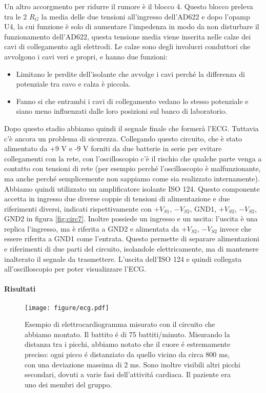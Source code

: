 Un altro accorgmento per ridurre il rumore è il blocco 4. Questo blocco preleva tra le 2 $R_G$ la media
delle due tensioni all'ingresso dell'AD622 e dopo l'opamp U4, la cui funzione è solo di
aumentare l'impedenza in modo da non disturbare il funzionamento dell'AD622, questa tensione media viene
inserita nelle calze dei cavi di collegamento agli elettrodi. Le calze sono degli involucri conduttori che avvolgono i
cavi veri e propri, e hanno due funzioni:

\begin{itemize}
    \item{Limitano le perdite dell'isolante che avvolge i cavi perché la differenza di potenziale tra cavo e calza è
        piccola.}
    \item{Fanno si che entrambi i cavi di collegamento vedano lo stesso potenziale e siano meno influenzati dalle loro
        posizioni sul banco di laboratorio.}
\end{itemize}

Dopo questo stadio abbiamo quindi il segnale finale che formerà l'ECG. Tuttavia c'è ancora un problema
di sicurezza. Collegando questo circuito, che è stato alimentato da +9 V e -9 V forniti da due batterie
in serie per evitare collegamenti con la rete, con l'oscilloscopio c'è il rischio che qualche parte venga
a contatto con tensioni di rete (per esempio perché l'oscilloscopio è malfunzionante, ma anche perché
semplicemente non sappiamo come sia realizzato internamente). Abbiamo quindi utilizzato un amplificatore
isolante ISO 124. Questo componente accetta in ingresso due diverse coppie di tensioni di alimentazione e due
riferimenti diversi, indicati rispettivamente con $+V_{S1}$, $-V_{S2}$, GND1, $+V_{S2}$, $-V_{S2}$, GND2 in
figura \ref{fig:circ7}.
Inoltre possiede un ingresso e un uscita: l'uscita è una replica l'ingresso, ma è riferita a GND2 e alimentata
da $+V_{S2}$, $-V_{S2}$ invece che essere riferita a GND1 come l'entrata. Questo permette di separare
alimentazioni e riferimenti di due parti del circuito, isolandole elettricamente, ma di mantenere inalterato il segnale
da trasmettere. L'uscita dell'ISO 124 e quindi collegata all'oscilloscopio per poter visualizzare l'ECG.

\paragraph{Risultati}

\begin{SCfigure*}[][p]
    \texttt{[image: figure/ecg.pdf]}
    \caption{Esempio di elettrocardiogramma misurato con il circuito che abbiamo montato.
        Il battito é di 75 battiti/minuto. Misurando la distanza tra i picchi,
        abbiamo notato che il cuore é estremamente preciso: ogni picco é distanziato da quello
        vicino da circa 800 ms, con una deviazione massima di 2 ms. Sono inoltre visibili altri
        picchi secondari, dovuti a varie fasi dell'attivitá cardiaca. Il paziente era uno dei
        membri del gruppo.}
    \label{fig:ecg7}
\end{SCfigure*}

